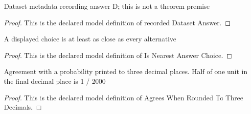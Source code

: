 \begin{definition}
  \label{def:physics:phyx-mini-0534:phyxminiproblems-problemphyxmini0534-recordeddatasetanswer}
  Dataset metadata recording answer D; this is not a theorem premise
\end{definition}
\begin{proof}
  This is the declared model definition of recorded Dataset Answer.
\end{proof}
\begin{definition}
  \label{def:physics:phyx-mini-0534:phyxminiproblems-problemphyxmini0534-isnearestanswerchoice}
  A displayed choice is at least as close as every alternative
\end{definition}
\begin{proof}
  This is the declared model definition of Is Nearest Answer Choice.
\end{proof}
\begin{definition}
  \label{def:physics:phyx-mini-0534:phyxminiproblems-problemphyxmini0534-agreeswhenroundedtothreedecimals}
  Agreement with a probability printed to three decimal places. Half of one unit in the final decimal place is 1 / 2000
\end{definition}
\begin{proof}
  This is the declared model definition of Agrees When Rounded To Three Decimals.
\end{proof}
